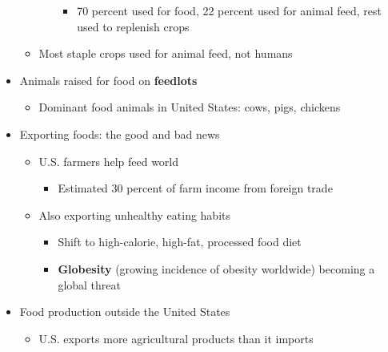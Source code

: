 \documentclass[12pt]{article}
\begin{document}
\begin{itemize}
\begin{itemize}
\begin{itemize}
                                    \begin{itemize}
                                        \item 70 percent used for food, 22 percent used for animal feed, rest used to replenish crops
                                    \end{itemize}
                            \end{itemize}
                        \item Most staple crops used for animal feed, not humans
                    \end{itemize}
                \item Animals raised for food on \textbf{feedlots}
                    \begin{itemize}
                        \item Dominant food animals in United States: cows, pigs, chickens
                    \end{itemize}
                \item Exporting foods: the good and bad news
                    \begin{itemize}
                        \item U.S. farmers help feed world
                            \begin{itemize}
                                \item Estimated 30 percent of farm income from foreign trade
                            \end{itemize}
                        \item Also exporting unhealthy eating habits
                            \begin{itemize}
                                \item Shift to high-calorie, high-fat, processed food diet
                                \item \textbf{Globesity} (growing incidence of obesity worldwide) becoming a global threat
                            \end{itemize}
                    \end{itemize}
                \item Food production outside the United States
                    \begin{itemize}
                        \item U.S. exports more agricultural products than it imports
                            \begin{itemize}

\end{itemize}
\end{itemize}
\end{itemize}
\end{document}
